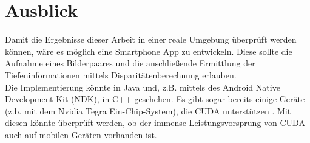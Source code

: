 \documentclass[%
  a4paper,%
  12pt,%
  style=screen, %
  oneside,
  blue,%
  ]{tubsartcl}
\begin{document}
\section{Ausblick}
Damit die Ergebnisse dieser Arbeit in einer reale Umgebung überprüft werden können, wäre es möglich eine
Smartphone App zu entwickeln. Diese sollte die Aufnahme eines Bilderpaares und die anschließende Ermittlung der
Tiefeninformationen mittels Disparitätenberechnung erlauben. \\
Die Implementierung könnte in Java und, z.B. mittels des Android Native Development Kit (NDK), in C++ geschehen.
Es gibt sogar bereits einige Geräte (z.b. mit dem Nvidia Tegra Ein-Chip-System), die CUDA unterstützen \cite{codeworks}.
Mit diesen könnte überprüft werden, ob der immense Leistungsvorsprung von CUDA auch auf mobilen Geräten vorhanden ist. 


%
% 

% 
\end{document}
